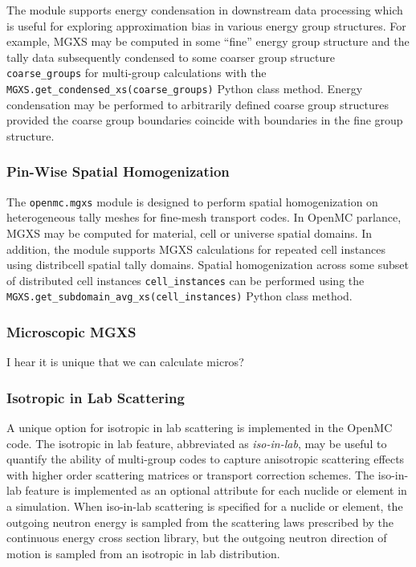 The module supports energy condensation in downstream data processing which is useful for exploring approximation bias in various energy group structures. For example, MGXS may be computed in some ``fine'' energy group structure and the tally data subsequently condensed to some coarser group structure \texttt{coarse_groups} for multi-group calculations with the \texttt{MGXS.get_condensed_xs(coarse_groups)} Python class method. Energy condensation may be performed to arbitrarily defined coarse group structures provided the coarse group boundaries coincide with boundaries in the fine group structure.


\subsubsection{Pin-Wise Spatial Homogenization}
\label{subsec:pinwise-homogenize}

The \texttt{openmc.mgxs} module is designed to perform spatial homogenization on heterogeneous tally meshes for fine-mesh transport codes. In OpenMC parlance, MGXS may be computed for material, cell or universe spatial domains. In addition, the module supports MGXS calculations for repeated cell instances using distribcell spatial tally domains\cite{lax2014distribcell}. Spatial homogenization across some subset of distributed cell instances \texttt{cell_instances} can be performed using the \texttt{MGXS.get_subdomain_avg_xs(cell_instances)} Python class method.



\subsubsection{Microscopic MGXS}
\label{subsec:micro-macro}

I hear it is unique that we can calculate micros?


\subsubsection{Isotropic in Lab Scattering}
\label{subsec:iso-in-lab}

A unique option for isotropic in lab scattering is implemented in the OpenMC code. The isotropic in lab feature, abbreviated as \textit{iso-in-lab}, may be useful to quantify the ability of multi-group codes to capture anisotropic scattering effects with higher order scattering matrices or transport correction schemes. The iso-in-lab feature is implemented as an optional attribute for each nuclide or element in a simulation. When iso-in-lab scattering is specified for a nuclide or element, the outgoing neutron energy is sampled from the scattering laws prescribed by the continuous energy cross section library, but the outgoing neutron direction of motion is sampled from an isotropic in lab distribution.

